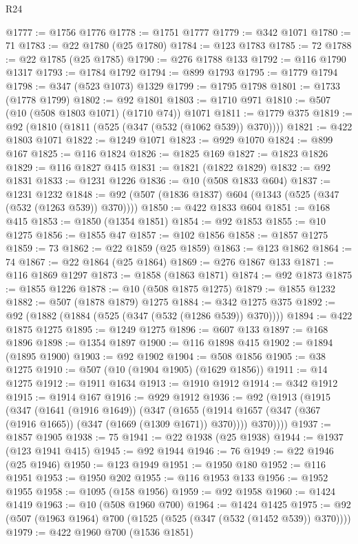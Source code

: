 \begin{lexlean}{R24}
\begin{coremodule}
@1777 := @1756 @1776
@1778 := @1751 @1777
@1779 := @342 @1071
@1780 := 71
@1783 := @22 @1780 (@25 @1780)
@1784 := @123 @1783
@1785 := 72
@1788 := @22 @1785 (@25 @1785)
@1790 := @276 @1788 @133
@1792 := @116 @1790 @1317
@1793 := @1784 @1792
@1794 := @899 @1793
@1795 := @1779 @1794
@1798 := @347 (@523 @1073) @1329
@1799 := @1795 @1798
@1801 := @1733 (@1778 @1799)
@1802 := @92 @1801
@1803 := @1710 @971
@1810 := @507 (@10 (@508 @1803 @1071) (@1710 @74)) @1071
@1811 := @1779 @375
@1819 := @92 (@1810 (@1811 (@525 (@347 (@532 (@1062 @539)) @370))))
@1821 := @422 @1803 @1071
@1822 := @1249 @1071
@1823 := @929 @1070
@1824 := @899 @167
@1825 := @116 @1824
@1826 := @1825 @169
@1827 := @1823 @1826
@1829 := @116 @1827 @415
@1831 := @1821 (@1822 @1829)
@1832 := @92 @1831
@1833 := @1231 @1226
@1836 := @10 (@508 @1833 @604)
@1837 := @1231 @1232
@1848 := @92 (@507 (@1836 @1837) @604 (@1343 (@525 (@347 (@532 (@1263 @539)) @370))))
@1850 := @422 @1833 @604
@1851 := @168 @415
@1853 := @1850 (@1354 @1851)
@1854 := @92 @1853
@1855 := @10 @1275
@1856 := @1855 @47
@1857 := @102 @1856
@1858 := @1857 @1275
@1859 := 73
@1862 := @22 @1859 (@25 @1859)
@1863 := @123 @1862
@1864 := 74
@1867 := @22 @1864 (@25 @1864)
@1869 := @276 @1867 @133
@1871 := @116 @1869 @1297
@1873 := @1858 (@1863 @1871)
@1874 := @92 @1873
@1875 := @1855 @1226
@1878 := @10 (@508 @1875 @1275)
@1879 := @1855 @1232
@1882 := @507 (@1878 @1879) @1275
@1884 := @342 @1275 @375
@1892 := @92 (@1882 (@1884 (@525 (@347 (@532 (@1286 @539)) @370))))
@1894 := @422 @1875 @1275
@1895 := @1249 @1275
@1896 := @607 @133
@1897 := @168 @1896
@1898 := @1354 @1897
@1900 := @116 @1898 @415
@1902 := @1894 (@1895 @1900)
@1903 := @92 @1902
@1904 := @508 @1856
@1905 := @38 @1275
@1910 := @507 (@10 (@1904 @1905) (@1629 @1856))
@1911 := @14 @1275
@1912 := @1911 @1634
@1913 := @1910 @1912
@1914 := @342 @1912
@1915 := @1914 @167
@1916 := @929 @1912
@1936 := @92
    (@1913
      (@1915
        (@347
          (@1641 (@1916 @1649))
          (@347
            (@1655 (@1914 @1657 (@347 (@367 (@1916 @1665)) (@347 (@1669 (@1309 @1671)) @370))))
            @370))))
@1937 := @1857 @1905
@1938 := 75
@1941 := @22 @1938 (@25 @1938)
@1944 := @1937 (@123 @1941 @415)
@1945 := @92 @1944
@1946 := 76
@1949 := @22 @1946 (@25 @1946)
@1950 := @123 @1949
@1951 := @1950 @180
@1952 := @116 @1951
@1953 := @1950 @202
@1955 := @116 @1953 @133
@1956 := @1952 @1955
@1958 := @1095 (@158 @1956)
@1959 := @92 @1958
@1960 := @1424 @1419
@1963 := @10 (@508 @1960 @700)
@1964 := @1424 @1425
@1975 := @92 (@507 (@1963 @1964) @700 (@1525 (@525 (@347 (@532 (@1452 @539)) @370))))
@1979 := @422 @1960 @700 (@1536 @1851)

\end{coremodule}
\end{lexlean}
